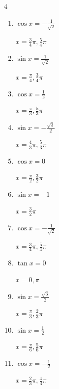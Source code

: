 \begin{multicols}{4}
\begin{enumerate}
        $\displaystyle x = \frac{2}{3}\pi , \frac{5}{3}\pi$

  \item $\displaystyle \cos{x}  = -\frac{1}{\sqrt{2}}$

        $\displaystyle x = \frac{3}{4}\pi , \frac{5}{4}\pi$

  \item $\displaystyle \sin{x}  = \frac{1}{\sqrt{2}}$

        $\displaystyle x = \frac{\pi}{4} , \frac{3}{4}\pi$

  \item $\displaystyle \cos{x}  = \frac{1}{2}$

        $\displaystyle x = \frac{\pi}{3} , \frac{5}{3}\pi$

  \item $\displaystyle \sin{x}  = -\frac{\sqrt{3}}{2}$

        $\displaystyle x = \frac{4}{3}\pi , \frac{5}{3}\pi$

  \item $\displaystyle \cos{x}  = 0$

        $\displaystyle x = \frac{\pi}{2} , \frac{3}{2}\pi$

  \item $\displaystyle \sin{x}  = -1$

        $\displaystyle x = \frac{3}{2}\pi$

  \item $\displaystyle \cos{x}  = -\frac{1}{\sqrt{2}}$

        $\displaystyle x = \frac{3}{4}\pi , \frac{5}{4}\pi$

  \item $\displaystyle \tan{x}  = 0$

        $\displaystyle x = 0 , \pi$

  \item $\displaystyle \sin{x}  = \frac{\sqrt{3}}{2}$

        $\displaystyle x = \frac{\pi}{3} , \frac{2}{3}\pi$

\columnbreak %

  \item $\displaystyle \sin{x}  = \frac{1}{2}$

        $\displaystyle x = \frac{\pi}{6} , \frac{5}{6}\pi$

  \item $\displaystyle \cos{x}  = -\frac{1}{2}$

        $\displaystyle x = \frac{2}{3}\pi , \frac{4}{3}\pi$


\end{enumerate}
\end{multicols}
